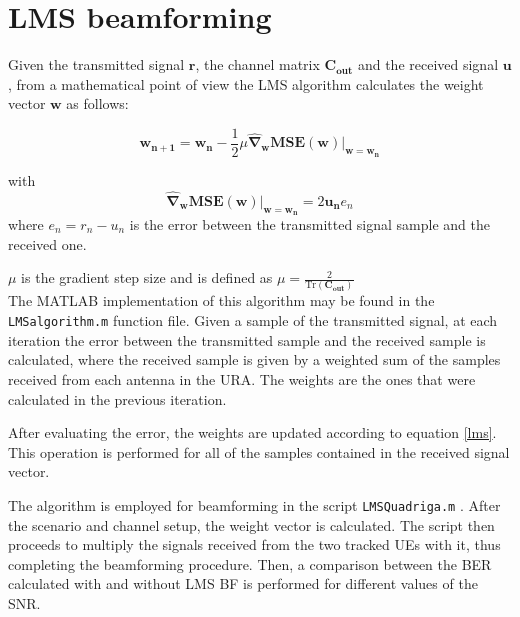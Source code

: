 \documentclass[a4paper,10pt]{article}
\begin{document}
\section{LMS beamforming}
Given the transmitted signal $\mathbf{r}$, the channel matrix $\mathbf{C_{out}}$ and the received signal $\mathbf{u}$, from a mathematical point of view the LMS algorithm calculates the weight vector $\mathbf{w}$ as follows:

\begin{equation} \label{lms}
	\mathbf{w_{n+1}} = \mathbf{w_{n}}-\frac{1}{2}\mu \mathbf{\widehat{\nabla}_w MSE}(\mathbf{w})|_{\mathbf{w=w_n}}
\end{equation}

with 
\begin{equation}
	\mathbf{\widehat{\nabla}_w MSE}(\mathbf{w})|_{\mathbf{w=w_n}} = 2\mathbf{u_n}e_n
\end{equation}
where $e_n = r_n - u_n$ is the error between the transmitted signal sample and the received one.

\noindent $\mu$ is the gradient step size and is defined as $\displaystyle \mu = \frac{2}{\mathrm{Tr}(\mathbf{C_{out}})}$ \\

The MATLAB implementation of this algorithm may be found in the \texttt{LMSalgorithm.m} function file. Given a sample of the transmitted signal, at each iteration the error between the transmitted sample and the received sample is calculated, where the received sample is given by a weighted sum of the samples received from each antenna in the URA. The weights are the ones that were calculated in the previous iteration. 

After evaluating the error, the weights are updated according to equation \eqref{lms}. This operation is performed for all of the samples contained in the received signal vector.

The algorithm is employed for beamforming in the script \texttt{LMSQuadriga.m} . After the scenario and channel setup, the weight vector is calculated. The script then proceeds to multiply the signals received from the two tracked UEs with it, thus completing the beamforming procedure. Then, a comparison between the BER calculated with and without LMS BF is performed for different values of the SNR.
\end{document}
